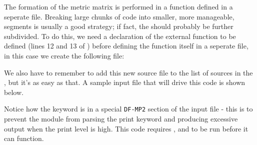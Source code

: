 
The formation of the metric matrix is performed in a function defined in a
seperate file.  Breaking large chunks of code into smaller, more manageable,
segments is usually a good strategy; if fact, the  should
probably be further subdivided.  To do this, we need a declaration of the
external function to be defined (lines 12 and 13 of ) before
defining the function itself in a seperate file, in this case we create the
following file:


We also have to remember to add this new source file to the list of sources in
the , but it's as easy as that.  A sample input file that will
drive this code is shown below.


Notice how the  keyword is in a special {\tt DF-MP2} section of
the input file - this is to prevent the  module from parsing the
print keyword and producing excessive output when the print level is high.
This code requires ,  and  to be run
before it can function.
